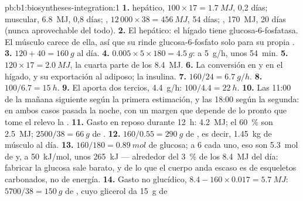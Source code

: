 \begin{solution}{pb:b1:biosyntheses-integration:1}
\textbf{1.}  hepático, $100\times 17 = \qty{1.7}{MJ}$, 0,2 días;
 muscular, \qty{6.8}{MJ}, 0,8 días; , $12\,000\times 38 =
\qty{456}{MJ}$, 54 días; , \qty{170}{MJ}, 20 días (nunca
aprovechable del todo).
\textbf{2.} El  hepático: el hígado tiene glucosa-6-fosfatasa. El
músculo carece de ella, así que su  rinde glucosa-6-fosfato solo
para su propia .
\textbf{3.} $120 + 40 = \qty{160}{g}$ al día.
\textbf{4.} $0.005\times 5\times 180 = \qty{4.5}{g}$: a \qty{5}{g/h}, unos \qty{54}{min}.
\textbf{5.} $120\times 17 = \qty{2.0}{MJ}$, la cuarta parte de los \qty{8.4}{MJ}.
\textbf{6.} La conversión en  y  en el hígado, y su
exportación al  adiposo; la insulina.
\textbf{7.} $160/24 = \qty{6.7}{g/h}$.
\textbf{8.} $100/6.7 = \qty{15}{h}$.
\textbf{9.} El  aporta dos tercios, \qty{4.4}{g/h}: $100/4.4 =
\qty{22}{h}$.
\textbf{10.} Las 11:00 de la mañana siguiente según la primera estimación, y
las 18:00 según la segunda: en ambos casos pasada la noche, con un margen
que depende de lo pronto que tome el relevo la .
\textbf{11.} Gasto en reposo durante \qty{12}{h}: \qty{4.2}{MJ}; el
\qty{60}{\%} son \qty{2.5}{MJ}; $2500/38 = \qty{66}{g}$ de .
\textbf{12.} $160/0.55 = \qty{290}{g}$ de , es decir, \qty{1.45}{kg}
de músculo al día.
\textbf{13.} $160/180 = \qty{0.89}{mol}$ de glucosa; a 6 
cada uno, eso son \qty{5.3}{mol} de  y, a \qty{50}{kJ/mol},
unos \qty{265}{kJ} --- alrededor del \qty{3}{\%} de los \qty{8.4}{MJ} del día: fabricar la
glucosa sale barato, y de lo que el cuerpo anda escaso es de esqueletos
carbonados, no de energía.
\textbf{14.} Gasto no glucídico, $8.4 - 160\times 0.017 =
\qty{5.7}{MJ}$:
$5700/38 = \qty{150}{g}$ de , cuyo glicerol da \qty{15}{g} de

\end{solution}
